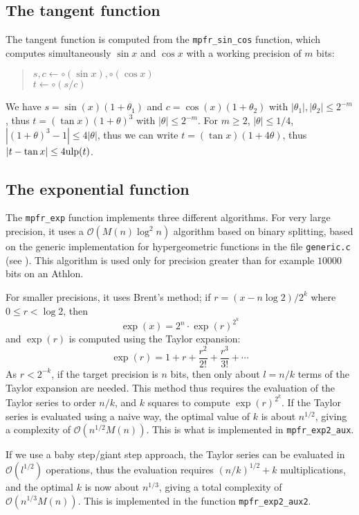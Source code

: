 \documentclass[12pt]{amsart}
\def\O{{\mathcal O}}
\def\ulp{{\rm ulp}}
\begin{document}
\subsection{The tangent function}

The tangent function is computed from the \texttt{mpfr\_sin\_cos} function,
which computes simultaneously $\sin x$ and $\cos x$
with a working precision of $m$ bits:
\begin{quote}
$s, c \leftarrow \circ(\sin x), \circ(\cos x)$ \quad [to nearest] \\
$t \leftarrow \circ(s/c)$ \quad [to nearest] \\
\end{quote}
We have $s = \sin(x) (1 + \theta_1)$ and $c = \cos(x) (1 + \theta_2)$
with $|\theta_1|, |\theta_2| \leq 2^{-m}$, thus
$t = (\tan x) (1 + \theta)^3$ with $|\theta| \leq 2^{-m}$.
For $m \geq 2$, $|\theta| \leq 1/4$,
$|(1 + \theta)^3 - 1| \leq 4 |\theta|$, thus we can write
$t = (\tan x) (1 + 4 \theta)$, thus
$|t - \tan x| \leq 4 \ulp(t)$.

\subsection{The exponential function}

The {\tt mpfr\_exp} function implements three different algorithms.
For very large precision, it uses a $\O(M(n) \log^2 n)$ algorithm
based on binary splitting, based on the generic implementation for
hypergeometric functions in the file \texttt{generic.c} (see \cite{Jeandel00}).
This algorithm is used only for precision greater
than for example $10000$ bits on an Athlon.

For smaller precisions, it uses Brent's method;
if $r = (x - n \log 2)/2^k$ where $0 \le r < \log 2$, then
\[ \exp(x) = 2^n \cdot \exp(r)^{2^k} \]
and $\exp(r)$ is computed using the Taylor expansion:
\[ \exp(r) =  1 + r + \frac{r^2}{2!} + \frac{r^3}{3!} + \cdots \]
As $r < 2^{-k}$, if the target precision is $n$ bits, then only
about $l = n/k$ terms of the Taylor expansion are needed.
This method thus requires the evaluation of the Taylor series to
order $n/k$, and $k$ squares to compute $\exp(r)^{2^k}$.
If the Taylor series is evaluated using a naive way, the optimal
value of $k$ is about $n^{1/2}$, giving a complexity of $\O(n^{1/2} M(n))$.
This is what is implemented in {\tt mpfr\_exp2\_aux}.

If we use a baby step/giant step approach, the Taylor series
can be evaluated in $\O(l^{1/2})$ operations,
thus the evaluation requires $(n/k)^{1/2} + k$ multiplications,
and the optimal $k$ is now about $n^{1/3}$,
giving a total complexity of $\O(n^{1/3} M(n))$.
This is implemented in the function {\tt mpfr\_exp2\_aux2}.
\end{document}
